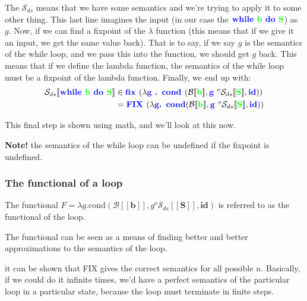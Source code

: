 \documentclass[11pt,a4paper,headsepline,titlepage,dvipsnames,cmyk]{scrartcl}
\begin{document}
The $\mathcal{S}_{ds}$ means that we have some semantics and we're trying
to apply it to some other thing. This last line imagines the input (in our
case the ${\color{blue}\textbf{while }} {\color{green} \textbf{b }}
{\color{blue} \textbf{do }} {\color{green} \textbf{S}}$) as $g$. Now, if
we can find a fixpoint of the $\lambda$ function (this means that if we
give it an input, we get the same value back). That is to say, if we say
$g$ is the semantics of the while loop, and we pass this into the
function, we should get $g$ back. This means that if we define the lambda
function, the semantics of the while loop must be a fixpoint of the lambda
function. Finally, we end up with:
\begin{align*}
\mathcal{S}_{ds}[\![ {\color{blue}\textbf{while }} {\color{green}
    \textbf{b }} {\color{blue} \textbf{do }} {\color{green} \textbf{S}}
    ]\!] &\in {\color{blue} \textbf{fix }} ( \lambda {\color{blue} \textbf{g . cond }} ( \mathcal{B} [\![ {\color{green} \textbf{b}} ]\!], {\color{blue}
\textbf{g }} ^o \mathcal{S}_{ds}[\![ {\color{green} \textbf{S}} ]\!],
{\color{blue} \textbf{id}})) \\
         &= {\color{blue} \textbf{FIX }} ( \lambda {\color{blue}
         \textbf{g. cond}} ( \mathcal{B} [\![ {\color{green} \textbf{b}}]\!],
         {\color{blue} \textbf{g }} ^o \mathcal{S}_{ds}[\![
         {\color{green} \textbf{S}} ]\!], {\color{blue} \textbf{id}} ))
\end{align*}

This final step is shown using math, and we'll look at this now.

\textbf{Note!} the semantics of the while loop can be undefined if the
fixpoint is undefined.

\subsubsection{The functional of a loop}%
\label{ssub:The functional of a loop}
The functional $F = \lambda g . \text{cond}( \mathcal{B} [\![ \textbf{b}
]\!], g ^o \mathcal{S}_{ds}[\![ \textbf{S} ]\!], \textbf{id} )$ is
referred to as the functional of the loop.

The functional can be seen as a means of finding better and better
approximations to the semantics of the loop.

it can be shown that FIX gives the correct semantics for all possible $n$.
Basically, if we could do it infinite times, we'd have a perfect semantics
of the particular loop in a particular state, because the loop must
terminate in finite steps.
\end{document}

